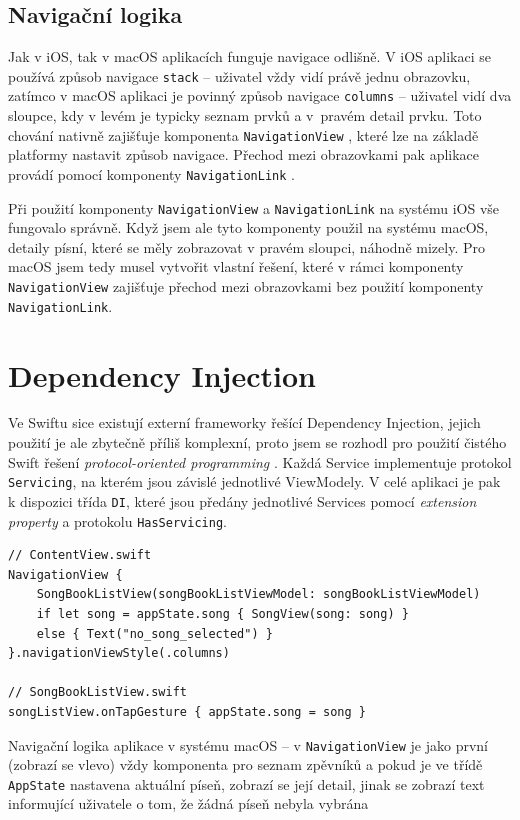 \subsection{Navigační logika}

Jak v iOS, tak v macOS aplikacích funguje navigace odlišně. V iOS aplikaci se používá způsob navigace \texttt{stack} -- uživatel vždy vidí právě jednu obrazovku, zatímco v macOS aplikaci je povinný způsob navigace \texttt{columns} -- uživatel vidí dva sloupce, kdy v levém je typicky seznam prvků a v~pravém detail prvku. Toto chování nativně zajišťuje komponenta \texttt{NavigationView} \cite{swiftui-navigationview}, které lze na základě platformy nastavit způsob navigace. Přechod mezi obrazovkami pak aplikace provádí pomocí komponenty \texttt{NavigationLink} \cite{swiftui-navigationlink}.

Při použití komponenty \texttt{NavigationView} a \texttt{NavigationLink} na systému iOS vše fungovalo správně. Když jsem ale tyto komponenty použil na systému macOS, detaily písní, které se měly zobrazovat v pravém sloupci, náhodně mizely. Pro macOS jsem tedy musel vytvořit vlastní řešení, které v rámci komponenty \texttt{NavigationView} zajišťuje přechod mezi obrazovkami bez použití komponenty \texttt{NavigationLink}.

\section{Dependency Injection}

Ve Swiftu sice existují externí frameworky řešící Dependency Injection, jejich použití je ale zbytečně příliš komplexní, proto jsem se rozhodl pro použití čistého Swift řešení \textit{protocol-oriented programming} \cite{protocol-oriented-programming}. Každá Service implementuje protokol \texttt{Servicing}, na kterém jsou závislé jednotlivé ViewModely. V celé aplikaci je pak k dispozici třída \texttt{DI}, které jsou předány jednotlivé Services pomocí \textit{extension property} a protokolu \texttt{HasServicing}.

\begin{listing}
\begin{verbatim}
// ContentView.swift
NavigationView {
    SongBookListView(songBookListViewModel: songBookListViewModel)
    if let song = appState.song { SongView(song: song) }
    else { Text("no_song_selected") }
}.navigationViewStyle(.columns)

// SongBookListView.swift
songListView.onTapGesture { appState.song = song }
\end{verbatim}
\caption[Navigační logika aplikace v systému macOS]{Navigační logika aplikace v systému macOS -- v \texttt{NavigationView} je jako první (zobrazí se vlevo) vždy komponenta pro seznam zpěvníků a pokud je ve třídě \texttt{AppState} nastavena aktuální píseň, zobrazí se její detail, jinak se zobrazí text informující uživatele o tom, že žádná píseň nebyla vybrána}
\end{listing}


